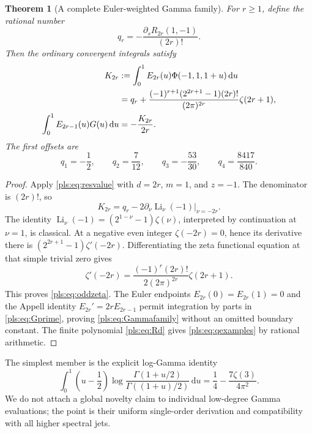 \documentclass[11pt,letterpaper]{article}
\numberwithin{equation}{section}
\newtheorem{theorem}{Theorem}[section]
\theoremstyle{definition}
\theoremstyle{remark}\newtheorem{remark}[theorem]{Remark}
\newcommand{\dd}{\,\mathrm d}
\newcommand{\Li}{\operatorname{Li}}
\begin{document}
\begin{theorem}[A complete Euler-weighted Gamma family]
\label{pls:thm:Gamma}
For $r\ge1$, define the rational number
\begin{equation}\label{pls:eq:qr}
 q_r=-\frac{\partial_sR_{2r}(1,-1)}{(2r)!}.
\end{equation}
Then the ordinary convergent integrals satisfy
\begin{align}
 K_{2r}&:=\int_0^1 E_{2r}(u)\Phi(-1,1,1+u)\dd u\notag\\
 &=q_r+
 \frac{(-1)^{r+1}(2^{2r+1}-1)(2r)!}{(2\pi)^{2r}}
                                        \zeta(2r+1),
                                        \label{pls:eq:oddzeta}\\
 \int_0^1 E_{2r-1}(u)G(u)\dd u&=-\frac{K_{2r}}{2r}.
                                        \label{pls:eq:Gammafamily}
\end{align}
The first offsets are
\begin{equation}\label{pls:eq:qexamples}
 q_1=-\frac12,\qquad q_2=\frac7{12},\qquad
 q_3=-\frac{53}{30},\qquad q_4=\frac{8417}{840}.
\end{equation}
\end{theorem}
\begin{proof}
Apply \eqref{pls:eq:resvalue} with $d=2r$, $m=1$, and $z=-1$.
The denominator is $(2r)!$, so
\[
 K_{2r}=q_r-2\left.\partial_\nu\Li_\nu(-1)\right|_{\nu=-2r}.
\]
The identity
$\Li_\nu(-1)=(2^{1-\nu}-1)\zeta(\nu)$, interpreted by
continuation at $\nu=1$, is classical. At a negative even integer
$\zeta(-2r)=0$, hence its derivative there is
$(2^{2r+1}-1)\zeta'(-2r)$. Differentiating the zeta functional
equation at that simple trivial zero gives \cite{DLMFInteger}
\[
 \zeta'(-2r)=\frac{(-1)^r(2r)!}{2(2\pi)^{2r}}\zeta(2r+1).
\]
This proves \eqref{pls:eq:oddzeta}. The Euler endpoints
$E_{2r}(0)=E_{2r}(1)=0$ and the Appell identity
$E_{2r}'=2rE_{2r-1}$ permit integration by parts in
\eqref{pls:eq:Gprime}, proving \eqref{pls:eq:Gammafamily} without
an omitted boundary constant. The finite polynomial
\eqref{pls:eq:Rd} gives \eqref{pls:eq:qexamples} by rational arithmetic.
\end{proof}

The simplest member is the explicit log-Gamma identity
\begin{equation}\label{pls:eq:Gammaexample}
 \boxed{\displaystyle
 \int_0^1\left(u-\frac12\right)
       \log\frac{\Gamma(1+u/2)}{\Gamma((1+u)/2)}\dd u
    =\frac14-\frac{7\zeta(3)}{4\pi^2}.}
\end{equation}
We do not attach a global novelty claim to individual low-degree
Gamma evaluations; the point is their uniform single-order derivation
and compatibility with all higher spectral jets.
\end{document}
